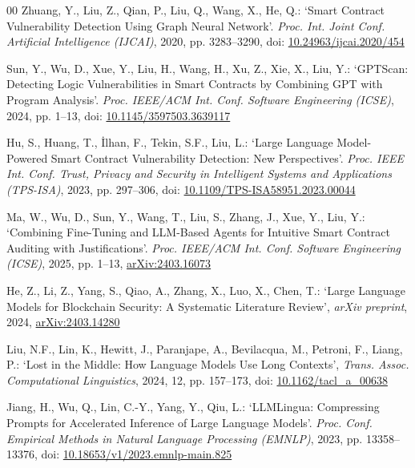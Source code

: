 \documentclass{ieeeaccess}
\begin{document}
\begin{thebibliography}{00}
Zhuang, Y., Liu, Z., Qian, P., Liu, Q., Wang, X., He, Q.: `Smart Contract Vulnerability Detection Using Graph Neural Network'. \textit{Proc. Int. Joint Conf. Artificial Intelligence (IJCAI)}, 2020, pp. 3283--3290, doi: \href{https://doi.org/10.24963/ijcai.2020/454}{10.24963/ijcai.2020/454}

Sun, Y., Wu, D., Xue, Y., Liu, H., Wang, H., Xu, Z., Xie, X., Liu, Y.: `GPTScan: Detecting Logic Vulnerabilities in Smart Contracts by Combining GPT with Program Analysis'. \textit{Proc. IEEE/ACM Int. Conf. Software Engineering (ICSE)}, 2024, pp. 1--13, doi: \href{https://doi.org/10.1145/3597503.3639117}{10.1145/3597503.3639117}

Hu, S., Huang, T., \.{I}lhan, F., Tekin, S.F., Liu, L.: `Large Language Model-Powered Smart Contract Vulnerability Detection: New Perspectives'. \textit{Proc. IEEE Int. Conf. Trust, Privacy and Security in Intelligent Systems and Applications (TPS-ISA)}, 2023, pp. 297--306, doi: \href{https://doi.org/10.1109/TPS-ISA58951.2023.00044}{10.1109/TPS-ISA58951.2023.00044}

Ma, W., Wu, D., Sun, Y., Wang, T., Liu, S., Zhang, J., Xue, Y., Liu, Y.: `Combining Fine-Tuning and LLM-Based Agents for Intuitive Smart Contract Auditing with Justifications'. \textit{Proc. IEEE/ACM Int. Conf. Software Engineering (ICSE)}, 2025, pp. 1--13, \href{https://arxiv.org/abs/2403.16073}{arXiv:2403.16073}

He, Z., Li, Z., Yang, S., Qiao, A., Zhang, X., Luo, X., Chen, T.: `Large Language Models for Blockchain Security: A Systematic Literature Review', \textit{arXiv preprint}, 2024, \href{https://arxiv.org/abs/2403.14280}{arXiv:2403.14280}

Liu, N.F., Lin, K., Hewitt, J., Paranjape, A., Bevilacqua, M., Petroni, F., Liang, P.: `Lost in the Middle: How Language Models Use Long Contexts', \textit{Trans. Assoc. Computational Linguistics}, 2024, 12, pp. 157--173, doi: \href{https://doi.org/10.1162/tacl_a_00638}{10.1162/tacl\_a\_00638}

Jiang, H., Wu, Q., Lin, C.-Y., Yang, Y., Qiu, L.: `LLMLingua: Compressing Prompts for Accelerated Inference of Large Language Models'. \textit{Proc. Conf. Empirical Methods in Natural Language Processing (EMNLP)}, 2023, pp. 13358--13376, doi: \href{https://doi.org/10.18653/v1/2023.emnlp-main.825}{10.18653/v1/2023.emnlp-main.825}


\end{thebibliography}
\end{document}
